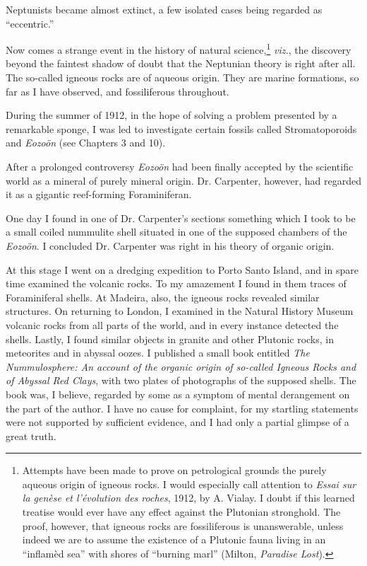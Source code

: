 \documentclass[a4paper, 12pt, oneside, landscape]{article}
\begin{document}
Neptunists became almost extinct, a few isolated cases being regarded as ``eccentric.''

Now comes a strange event in the history of natural science,\footnote{Attempts have been made to prove on petrological grounds the purely aqueous origin of igneous rocks. I would especially call attention to \emph{Essai sur la genèse et l'évolution des roches}, 1912, by A. Vialay. I doubt if this learned treatise would ever have any effect against the Plutonian stronghold. The proof, however, that igneous rocks are fossiliferous is unanswerable, unless indeed we are to assume the existence of a Plutonic fauna living in an ``inflamèd sea'' with shores of ``burning marl'' (Milton, \emph{Paradise Lost}).} \emph{viz.}, the discovery beyond the faintest shadow of doubt that the Neptunian theory is right after all. The so-called igneous rocks are of aqueous origin. They are marine formations, so far as I have observed, and fossiliferous throughout.

During the summer of 1912, in the hope of solving a problem presented by a remarkable sponge, I was led to investigate certain fossils called Stromatoporoids and \emph{Eozoön} (see Chapters 3 and 10).

After a prolonged controversy \emph{Eozoön} had been finally accepted by the scientific world as a mineral of purely mineral origin. Dr. Carpenter, however, had regarded it as a gigantic reef-forming Foraminiferan.

One day I found in one of Dr. Carpenter's sections something which I took to be a small coiled nummulite shell situated in one of the supposed chambers of the \emph{Eozoön}. I concluded Dr. Carpenter was right in his theory of organic origin.

At this stage I went on a dredging expedition to Porto Santo Island, and in spare time examined the volcanic rocks. To my amazement I found in them traces of Foraminiferal shells. At Madeira, also, the igneous rocks revealed similar structures. On returning to London, I examined in the Natural History Museum volcanic rocks from all parts of the world, and in every instance detected the shells. Lastly, I found similar objects in granite and other Plutonic rocks, in meteorites and in abyssal oozes. I published a small book entitled \emph{The Nummulosphere: An account of the organic origin of so-called Igneous Rocks and of Abyssal Red Clays}, with two plates of photographs of the supposed shells. The book was, I believe, regarded by some as a symptom of mental derangement on the part of the author. I have no cause for complaint, for my startling statements were not supported by sufficient evidence, and I had only a partial glimpse of a great truth.
\end{document}
